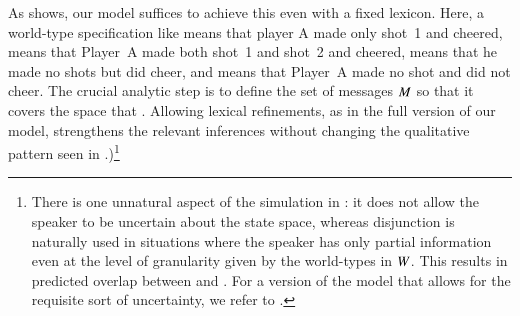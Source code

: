 \documentclass[leqno,12pt]{article}
\begin{document}
As  shows, our model suffices to achieve this
even with a fixed lexicon. Here, a world-type specification like
 means that player A made only shot~1 and cheered,
 means that Player~A made both shot~1 and
shot~2 and cheered,  means that he made no shots but did
cheer, and \word{--} means that Player~A made no shot and did not
cheer. The crucial analytic step is to define the set of messages
$M$ so that it covers the space that
\citeauthor{Sauerland01}. Allowing lexical refinements, as in the full
version of our model, strengthens the relevant inferences without
changing the qualitative pattern seen in
.)\footnote{There is one unnatural aspect of the
  simulation in : it does not allow the speaker
  to be uncertain about the state space, whereas disjunction is
  naturally used in situations where the speaker has only partial
  information even at the level of granularity given by the
  world-types in $W$. This results in predicted overlap between
   and . For a version of the model that allows for the requisite
  sort of uncertainty, we refer to \citealt{Potts:Levy:2015}.}
  
\end{document}
